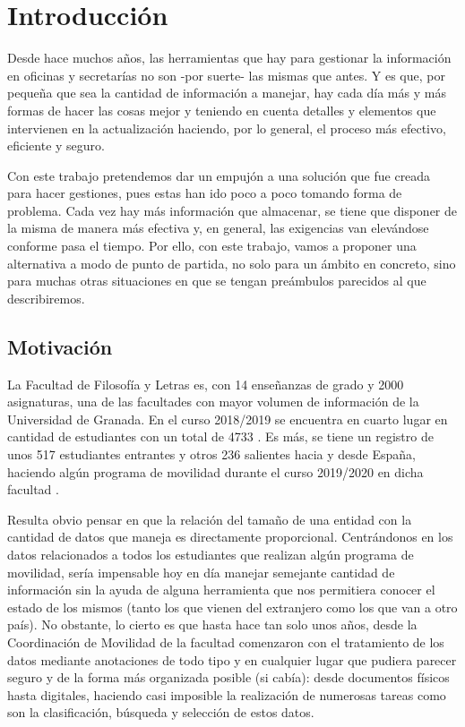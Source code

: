 \section{Introducción}

Desde hace muchos años, las herramientas que hay para gestionar la información en oficinas y secretarías no son -por suerte- las mismas que antes. Y es que, por pequeña que sea la cantidad de información a manejar, hay cada día más y más formas de hacer las cosas mejor y teniendo en cuenta detalles y elementos que intervienen en la actualización haciendo, por lo general, el proceso más efectivo, eficiente y seguro.

Con este trabajo pretendemos dar un empujón a una solución que fue creada para hacer gestiones, pues estas han ido poco a poco tomando forma de problema. Cada vez hay más información que almacenar, se tiene que disponer de la misma de manera más efectiva y, en general, las exigencias van elevándose conforme pasa el tiempo. Por ello, con este trabajo, vamos a proponer una alternativa a modo de punto de partida, no solo para un ámbito en concreto, sino para muchas otras situaciones en que se tengan preámbulos parecidos al que describiremos. 

\subsection{Motivación}

La Facultad de Filosofía y Letras es, con 14 enseñanzas de grado y 2000 asignaturas, una de las facultades con mayor volumen de información de la Universidad de Granada. En el curso 2018/2019 se encuentra en cuarto lugar en cantidad de estudiantes con un total de 4733 \cite{MemAcademica}. Es más, se tiene un registro de unos 517 estudiantes entrantes y otros 236 salientes hacia y desde España, haciendo algún programa de movilidad durante el curso 2019/2020 en dicha facultad \cite{MemFYL}.

Resulta obvio pensar en que la relación del tamaño de una entidad con la cantidad de datos que maneja es directamente proporcional. Centrándonos en los datos relacionados a todos los estudiantes que realizan algún programa de movilidad, sería impensable hoy en día manejar semejante cantidad de información sin la ayuda de alguna herramienta que nos permitiera conocer el estado de los mismos (tanto los que vienen del extranjero como los que van a otro país). No obstante, lo cierto es que hasta hace tan solo unos años, desde la Coordinación de Movilidad de la facultad comenzaron con el tratamiento de los datos mediante anotaciones de todo tipo y en cualquier lugar que pudiera parecer seguro y de la forma más organizada posible (si cabía): desde documentos físicos hasta digitales, haciendo casi imposible la realización de numerosas tareas como son la clasificación, búsqueda y selección de estos datos.

